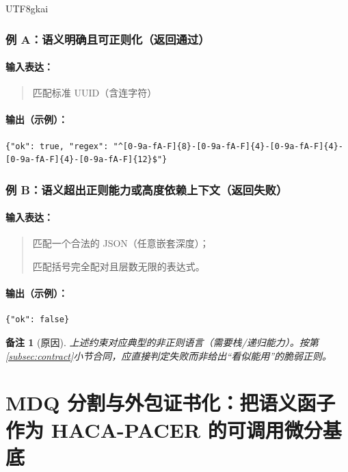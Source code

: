 \documentclass[12pt]{article}
\newtheorem{remark}{备注}[section]
\begin{document}
\begin{CJK*}{UTF8}{gkai}
\subsubsection{例 A：语义明确且可正则化（返回通过）}

\paragraph{输入表达：}
\begin{quote}
匹配标准 UUID（含连字符）
\end{quote}

\paragraph{输出（示例）：}
\begin{verbatim}
{"ok": true, "regex": "^[0-9a-fA-F]{8}-[0-9a-fA-F]{4}-[0-9a-fA-F]{4}-[0-9a-fA-F]{4}-[0-9a-fA-F]{12}$"}
\end{verbatim}

\subsubsection{例 B：语义超出正则能力或高度依赖上下文（返回失败）}

\paragraph{输入表达：}
\begin{quote}
匹配一个合法的 JSON（任意嵌套深度）；

匹配括号完全配对且层数无限的表达式。
\end{quote}

\paragraph{输出（示例）：}
\begin{verbatim}
{"ok": false}
\end{verbatim}

\begin{remark}[原因]
上述约束对应典型的非正则语言（需要栈/递归能力）。按第\ref{subsec:contract}小节合同，应直接判定失败而非给出“看似能用”的脆弱正则。
\end{remark}

\clearpage

\section{MDQ 分割与外包证书化：把语义函子作为 HACA-PACER 的可调用微分基底}
\label{sec:mdq-outsourcing-haca-pacer}


\end{CJK*}
\end{document}
